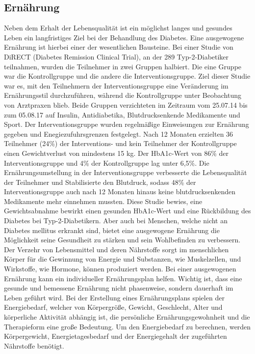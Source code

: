 \documentclass[a4paper,11pt]{article}%
\renewcommand{\\}{\vspace*{0.5\baselineskip} \newline}
\begin{document}
	\subsection{Ernährung}
		Neben dem Erhalt der Lebensqualität ist ein möglichst langes und gesundes Leben ein langfristiges Ziel bei der Behandlung des Diabetes. Eine ausgewogene Ernährung ist hierbei einer der wesentlichen Bausteine. Bei einer Studie von DiRECT (Diabetes Remission Clinical Trial)\cite{DiRECT}, an der 289 Typ-2-Diabetiker teilnahmen, wurden die Teilnehmer in zwei Gruppen halbiert. Die eine Gruppe war die Kontrollgruppe und die andere die Interventionsgruppe. Ziel dieser Studie war es, mit den Teilnehmern der Interventionsgruppe eine Veränderung im Ernährungsstil durchzuführen, während die Kontrollgruppe unter Beobachtung von Arztpraxen blieb. Beide Gruppen verzichteten im Zeitraum vom 25.07.14 bis zum 05.08.17 auf Insulin, Antidiabetika, Blutdrucksenkende Medikamente und Sport. Der Interventionsgruppe wurden regelmäßige Einweisungen zur Ernährung gegeben und Enegiezufuhrsgrenzen festgelegt. Nach 12 Monaten erzielten 36 Teilnehmer (24\%) der Interventions- und kein Teilnehmer der Kontrollgruppe einen Gewichtverlust von mindestens 15 kg. Der HbA1c-Wert von 86\% der Interventionsgruppe und 4\% der Kontrollgruppe lag unter 6,5\%. Die Ernährungsumstellung in der Interventionsgruppe verbesserte die Lebensqualität der Teilnehmer und Stabilisierte den Blutdruck, sodass 48\% der Interventionsgruppe auch nach 12 Monaten hinaus keine blutdrucksenkenden Medikamente mehr einnehmen mussten. Diese Studie bewies, eine Gewichtsabnahme bewirkt einen gesunden HbA1c-Wert und eine Rückbildung des Diabetes bei Typ-2-Diabetikern.\\
		Aber auch bei Menschen, welche nicht an Diabetes mellitus erkrankt sind, bietet eine ausgewogene Ernährung die Möglichkeit seine Gesundheit zu stärken und sein Wohlbefinden zu verbessern. \newline	
		Der Verzehr von Lebensmittel und deren Nährstoffe sorgt im menschlichen Körper für die Gewinnung von Energie und Substanzen, wie Muskelzellen, und Wirkstoffe, wie Hormone, können produziert werden.\cite{ND}\\
		Bei einer ausgewogenen Ernährung kann ein individueller Ernährungsplan helfen. Wichtig ist, dass eine gesunde und bemessene Ernährung nicht phasenweise, sondern dauerhaft im Leben geführt wird. Bei der Erstellung eines Ernährungsplans spielen der Energiebedarf, welcher von Körpergröße, Gewicht, Geschlecht, Alter und körperliche Aktivität abhängig ist, die persönliche Ernährungsgewohnheit und die Therapieform eine große Bedeutung. Um den Energiebedarf zu berechnen, werden Körpergewicht, Energietagesbedarf und der Energiegehalt der zugeführten Nährstoffe benötigt.\cite{SG} \newline
\end{document}
